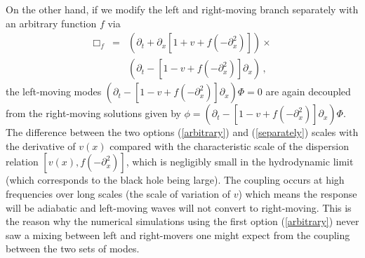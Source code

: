 \documentclass[aps,prl,showpacs,amssymb,nofootinbib,twocolumn]{revtex4}
\newcommand{\nn}{\nonumber\\}
\newcommand{\bea}{\begin{eqnarray}}
\newcommand{\ea}{\end{eqnarray}}
\begin{document}
%
On the other hand, if we modify the left and right-moving branch 
separately with an arbitrary function $f$ via 
%
\bea
\label{separately}
\Box_f
&=&
\left(\partial_t+\partial_x[1+v+f(-\partial_x^2)]\right)
\times
\nn
&&
\left(\partial_t-[1-v+f(-\partial_x^2)]\partial_x\right)
\,,
\ea
%
the left-moving modes 
$(\partial_t-[1-v+f(-\partial_x^2)]\partial_x)\Phi=0$
are again decoupled from the right-moving solutions given by 
$\phi=(\partial_t-[1-v+f(-\partial_x^2)]\partial_x)\Phi$.  
%
The difference between the two options (\ref{arbitrary}) and 
(\ref{separately}) scales with the derivative of $v(x)$ compared with
the characteristic scale of the dispersion relation 
$[v(x),f(-\partial_x^2)]$, which is negligibly small in the
hydrodynamic limit (which corresponds to the black hole being large). 
The coupling occurs %
at high frequencies over long scales (the scale of variation of $v$)
which means the response will be adiabatic and left-moving waves will
not convert to right-moving.  
%
This is the reason why the numerical simulations using the first
option (\ref{arbitrary}) never saw a mixing between left and
right-movers one might expect from the coupling between the two sets
of modes.  
\end{document}
